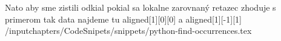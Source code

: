 Nato aby sme zistili odkial pokial sa lokalne zarovnaný retazec zhoduje s primerom tak data najdeme tu aligned[1][0][0] a aligned[1][-1][1]
/input{chapters/CodeSnipets/snippets/python-find-occurrences.tex}
